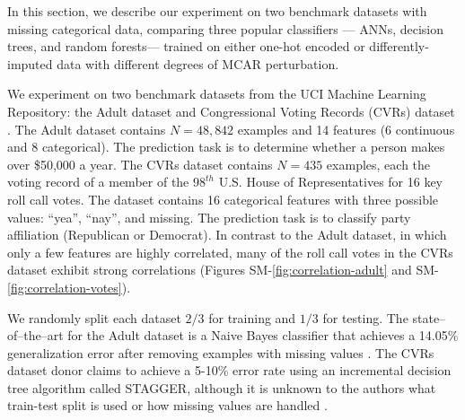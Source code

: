 \documentclass[10pt]{book}
\theoremstyle{definition}
\begin{document}
\par


\setcounter{chapter}{3}
\setcounter{equation}{0} %

In this section, we describe our experiment on two benchmark datasets with missing categorical data, comparing three popular classifiers --- ANNs, decision trees, and random forests--- trained on either one-hot encoded or differently-imputed data with different degrees of MCAR perturbation.

\par
{}

We experiment on two benchmark datasets from the UCI Machine Learning Repository: the Adult dataset and Congressional Voting Records (CVRs) dataset \citep{Lichman2013}. The Adult dataset contains $N=48,842$ examples and 14 features (6 continuous and 8 categorical). The prediction task is to determine whether a person makes over \$50,000 a year. The CVRs dataset contains $N=435$ examples, each the voting record of a member of the $98^{th}$ U.S. House of Representatives for 16 key roll call votes. The dataset contains 16 categorical features with three possible values: ``yea'', ``nay'', and missing. The prediction task is to classify party affiliation (Republican or Democrat). In contrast to the Adult dataset, in which only a few features are highly correlated, many of the roll call votes in the CVRs dataset exhibit strong correlations (Figures SM-\ref{fig:correlation-adult} and SM-\ref{fig:correlation-votes}).

We randomly split each dataset $2/3$ for training and $1/3$ for testing. The state--of--the--art for the Adult dataset is a Naive Bayes classifier that achieves a 14.05\% generalization error after removing examples with missing values \citep{kohavi1996}. The CVRs dataset donor claims to achieve a 5-10\% error rate using an incremental decision tree algorithm called STAGGER, although it is unknown to the authors what train-test split is used or how missing values are handled \citep{schlimmer1987,schlimmer1986}.

\par
{}
\end{document}
